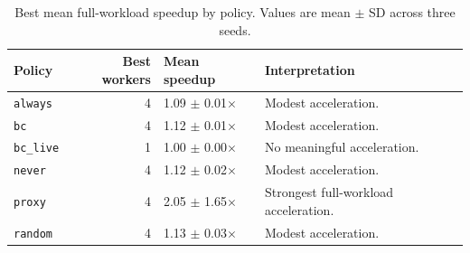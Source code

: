 \begin{table}[H]
\centering
\caption{Best mean full-workload speedup by policy. Values are mean $\pm$ SD across three seeds.}
\label{tab:parallel_speedup_full}
\footnotesize
\setlength{\tabcolsep}{4pt}
\begin{tabularx}{\columnwidth}{lrlY}
\toprule
Policy & Best workers & Mean speedup & Interpretation \\
\midrule
\texttt{always} & 4 & 1.09 $\pm$ 0.01$\times$ & Modest acceleration. \\
\texttt{bc} & 4 & 1.12 $\pm$ 0.01$\times$ & Modest acceleration. \\
\texttt{bc\_live} & 1 & 1.00 $\pm$ 0.00$\times$ & No meaningful acceleration. \\
\texttt{never} & 4 & 1.12 $\pm$ 0.02$\times$ & Modest acceleration. \\
\texttt{proxy} & 4 & 2.05 $\pm$ 1.65$\times$ & Strongest full-workload acceleration. \\
\texttt{random} & 4 & 1.13 $\pm$ 0.03$\times$ & Modest acceleration. \\
\bottomrule
\end{tabularx}
\end{table}

